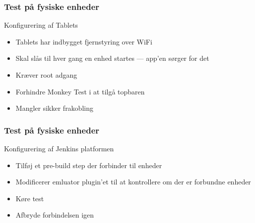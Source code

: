 \begin{frame}
    \frametitle{Test på fysiske enheder}
    Konfigurering af Tablets
    \begin{itemize}
        \item Tablets har indbygget fjernstyring over WiFi
        \item Skal slås til hver gang en enhed startes --- app'en sørger for det
        \item Kræver root adgang
        \item Forhindre Monkey Test i at tilgå topbaren
        \item Mangler sikker frakobling
    \end{itemize}
\end{frame}

\begin{frame}
    \frametitle{Test på fysiske enheder}
    Konfigurering af Jenkins platformen
    \begin{itemize}
        \item Tilføj et pre-build step der forbinder til enheder
        \item Modificerer emluator plugin'et til at kontrollere om der er forbundne enheder
        \item Køre test
        \item Afbryde forbindelsen igen
    \end{itemize}
\end{frame}
